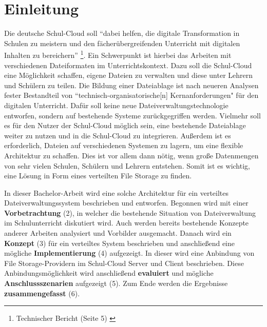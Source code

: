 \section{Einleitung}
\label{sec:intro}

Die deutsche Schul-Cloud soll ``dabei helfen, die digitale Transformation in Schulen zu meistern und den fächerübergreifenden Unterricht mit digitalen Inhalten zu bereichern'' \footnote{ Technischer Bericht (Seite 5) \cite{paper:technischerbericht}}. Ein Schwerpunkt ist hierbei das Arbeiten mit verschiedenen Dateiformaten im Unterrichtskontext. Dazu soll die Schul-Cloud eine Möglichkeit schaffen, eigene Dateien zu verwalten und diese unter Lehrern und Schülern zu teilen. Die Bildung einer Dateiablage ist nach neueren Analysen fester Bestandteil von ``technisch-organisatorische[n] Kernanforderungen" \cite{paper:breiterstolpmannzeising2015} für den digitalen Unterricht. Dafür soll keine neue Dateiverwaltungstechnologie entworfen, sondern auf bestehende Systeme zurückgegriffen werden. Vielmehr soll es für den Nutzer der Schul-Cloud möglich sein, eine bestehende Dateiablage weiter zu nutzen und in die Schul-Cloud zu integrieren. Außerdem ist es erforderlich, Dateien auf verschiedenen Systemen zu lagern, um eine flexible Architektur zu schaffen. Dies ist vor allem dann nötig, wenn große Datenmengen von sehr vielen Schulen, Schülern und Lehrern entstehen. Somit ist es wichtig, eine Lösung in Form eines verteilten File Storage zu finden. 

In dieser Bachelor-Arbeit wird eine solche Architektur für ein verteiltes Dateiverwaltungssystem beschrieben und entworfen. Begonnen wird mit einer \textbf{Vorbetrachtung} (2), in welcher die bestehende Situation von Dateiverwaltung im Schulunterricht diskutiert wird. Auch werden bereits bestehende Konzepte anderer Arbeiten analysiert und Vorbilder ausgemacht. Danach wird ein \textbf{Konzept} (3) für ein verteiltes System beschrieben und anschließend eine mögliche \textbf{Implementierung} (4)  aufgezeigt. In dieser wird eine Anbindung von File Storage-Providern im Schul-Cloud Server und Client beschrieben. Diese Anbindungsmöglichkeit wird anschließend \textbf{evaluiert} und mögliche \textbf{Anschlussszenarien} aufgezeigt (5). Zum Ende werden die Ergebnisse \textbf{zusammengefasst} (6).

\clearpage
